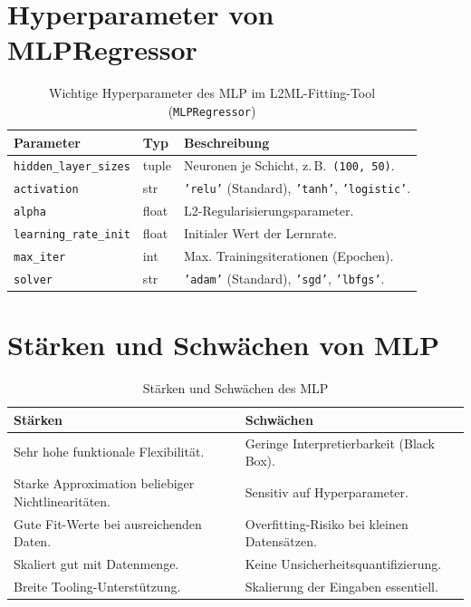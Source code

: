 \documentclass[11pt,a4paper]{report}
\begin{document}
\section{Hyperparameter von MLPRegressor}

\begin{table}[H]
\centering
\caption{Wichtige Hyperparameter des MLP im L2ML-Fitting-Tool (\texttt{MLPRegressor})}
\label{tab:mlp_params}
\begin{tabular}{p{4.5cm}p{2cm}p{7cm}}
\toprule
\textbf{Parameter} & \textbf{Typ} & \textbf{Beschreibung} \\
\midrule
\texttt{hidden\_layer\_sizes} & tuple & Neuronen je Schicht, z.\,B.\ \texttt{(100, 50)}. \\
\texttt{activation} & str & \texttt{'relu'} (Standard), \texttt{'tanh'}, \texttt{'logistic'}. \\
\texttt{alpha} & float & L2-Regularisierungsparameter. \\
\texttt{learning\_rate\_init} & float & Initialer Wert der Lernrate. \\
\texttt{max\_iter} & int & Max. Trainingsiterationen (Epochen). \\
\texttt{solver} & str & \texttt{'adam'} (Standard), \texttt{'sgd'}, \texttt{'lbfgs'}. \\
\bottomrule
\end{tabular}
\end{table}

\section{St\"{a}rken und Schw\"{a}chen von MLP}

\begin{table}[H]
\centering
\caption{St\"{a}rken und Schw\"{a}chen des MLP}
\label{tab:mlp_pros_cons}
\begin{tabular}{p{6.5cm}p{6.5cm}}
\toprule
\textbf{St\"{a}rken} & \textbf{Schw\"{a}chen} \\
\midrule
Sehr hohe funktionale Flexibilit\"{a}t. & Geringe Interpretierbarkeit (Black Box). \\
Starke Approximation beliebiger Nichtlinearit\"{a}ten. & Sensitiv auf Hyperparameter. \\
Gute Fit-Werte bei ausreichenden Daten. & Overfitting-Risiko bei kleinen Datens\"{a}tzen. \\
Skaliert gut mit Datenmenge. & Keine Unsicherheitsquantifizierung. \\
Breite Tooling-Unterst\"{u}tzung. & Skalierung der Eingaben essentiell. \\
\bottomrule
\end{tabular}
\end{table}
\end{document}
